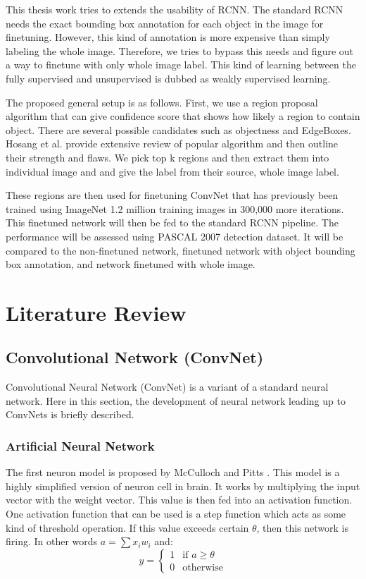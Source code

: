 \documentclass[a4paper,11pt]{kth-mag}
\begin{document}
This thesis work tries to extends the usability of RCNN. The standard RCNN needs the exact bounding box annotation for each object in the image for finetuning. However, this kind of annotation is more expensive than simply labeling the whole image. Therefore, we tries to bypass this needs and figure out a way to finetune with only whole image label. This kind of learning between the fully supervised and unsupervised is dubbed as weakly supervised learning.

The proposed general setup is as follows. First, we use a region proposal algorithm that can give confidence score that shows how likely a region to contain object. There are several possible candidates such as objectness \cite{obj} and EdgeBoxes. Hosang et al. \cite{hosang2014} provide extensive review of popular algorithm and then outline their strength and flaws. We pick top k regions and then extract them into individual image and and give the label from their source, whole image label.

These regions are then used for finetuning ConvNet that has previously been trained using ImageNet 1.2 million training images in 300,000 more iterations. This finetuned network will then be fed to the standard RCNN pipeline. The performance will be assessed using PASCAL 2007 detection dataset. It will be compared to the non-finetuned network, finetuned network with object bounding box annotation, and network finetuned with whole image.


\chapter{Literature Review}
\section{Convolutional Network (ConvNet)}
Convolutional Neural Network (ConvNet) is a variant of a standard neural network. Here in this section, the development of neural network leading up to ConvNets is briefly described.

\subsection{Artificial Neural Network}
The first neuron model is proposed by McCulloch and Pitts \cite{mcculloch1943neuron}. This model is a highly simplified version of neuron cell in brain. It works by multiplying the input vector with the weight vector. This value is then fed into an activation function. One activation function that can be used is a step function which acts as some kind of threshold operation. If this value exceeds certain $\theta$, then this network is firing. In other words $ a = \sum x_i w_i $ and:
\begin{equation}
y = 
	\begin{cases}
	1 & \text{if } a \geq \theta \\
	0 & \text{otherwise}
	\end{cases}
\end{equation}
\end{document}
